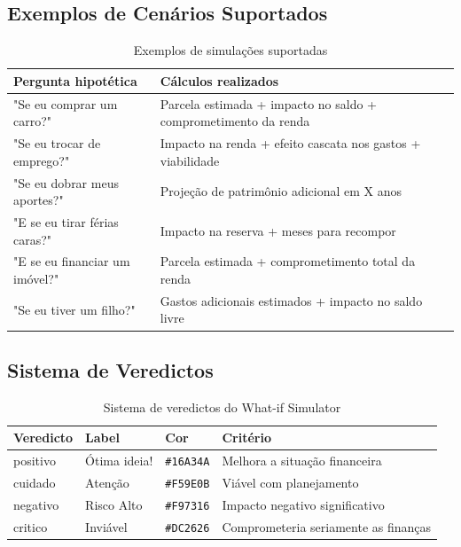 \documentclass[12pt, a4paper, oneside]{report}
\begin{document}
\subsection{Exemplos de Cenários Suportados}

\begin{table}[H]
\centering
\caption{Exemplos de simulações suportadas}
\begin{tabularx}{\textwidth}{l X}
\toprule
Pergunta hipotética & Cálculos realizados \\
\midrule
"Se eu comprar um carro?" & Parcela estimada + impacto no saldo + comprometimento da renda \\
"Se eu trocar de emprego?" & Impacto na renda + efeito cascata nos gastos + viabilidade \\
"Se eu dobrar meus aportes?" & Projeção de patrimônio adicional em X anos \\
"E se eu tirar férias caras?" & Impacto na reserva + meses para recompor \\
"E se eu financiar um imóvel?" & Parcela estimada + comprometimento total da renda \\
"Se eu tiver um filho?" & Gastos adicionais estimados + impacto no saldo livre \\
\bottomrule
\end{tabularx}
\end{table}

\subsection{Sistema de Veredictos}

\begin{table}[H]
\centering
\caption{Sistema de veredictos do What-if Simulator}
\begin{tabularx}{\textwidth}{l l l X}
\toprule
Veredicto & Label & Cor & Critério \\
\midrule
positivo & Ótima ideia! & \colorbox{success!20}{\texttt{\#16A34A}} & Melhora a situação financeira \\
cuidado & Atenção & \colorbox{warning!20}{\texttt{\#F59E0B}} & Viável com planejamento \\
negativo & Risco Alto & \colorbox{primary!20}{\texttt{\#F97316}} & Impacto negativo significativo \\
critico & Inviável & \colorbox{danger!20}{\texttt{\#DC2626}} & Comprometeria seriamente as finanças \\
\bottomrule
\end{tabularx}
\end{table}
\end{document}
